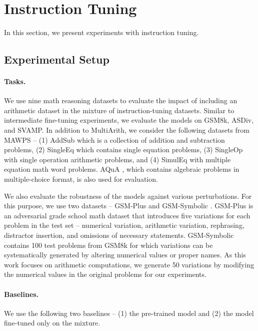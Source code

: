 \section{Instruction Tuning}
In this section, we present experiments with instruction tuning.

\subsection{Experimental Setup}
\paragraph{Tasks.}
We use nine math reasoning datasets to evaluate the impact of including an arithmetic dataset in the mixture of instruction-tuning datasets. Similar to intermediate fine-tuning experiments, we evaluate the models on GSM8k, ASDiv, and SVAMP. In addition to MultiArith, we consider the following datasets from MAWPS \citep{koncel2016mawps} -- (1) AddSub \citep{hosseini-etal-2014-learning} which is a collection of addition and subtraction problems, (2) SingleEq \citep{roy2015reasoning} which contains single equation problems, (3) SingleOp \citep{roy2015reasoning} with single operation arithmetic problems, and (4) SimulEq \citep{kushman2014learning} with multiple equation math word problems. AQuA \citep{ling2017program}, which contains algebraic problems in multiple-choice format, is also used for evaluation.

We also evaluate the robustness of the models against various perturbations. For this purpose, we use two datasets -- GSM-Plus \citep{li2024gsm} and GSM-Symbolic \citep{mirzadeh2024gsm}. GSM-Plus is an adversarial grade school math dataset that introduces five variations for each problem in the \gsm{} test set -- numerical variation, arithmetic variation, rephrasing, distractor insertion, and omissions of necessary statements. GSM-Symbolic contains 100 test problems from GSM8k for which variations can be systematically generated by altering numerical values or proper names. As this work focuses on arithmetic computations, we generate 50 variations by modifying the numerical values in the original problems for our experiments.

\paragraph{Baselines.}
We use the following two baselines -- (1) the pre-trained model and (2) the model fine-tuned only on the \tulu{} mixture.

